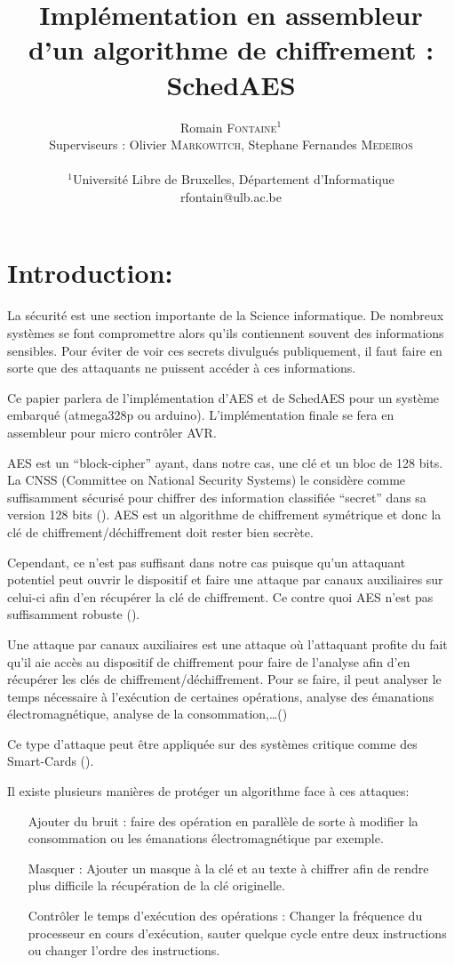 \documentclass[letterpaper]{article}
\author{Romain \textsc{Fontaine}$^{1}$\\
    Superviseurs : Olivier \textsc{Markowitch}, Stephane Fernandes \textsc{Medeiros}\\
    \mbox{}\\
    $^1$Université Libre de Bruxelles, Département d’Informatique \\
    rfontain@ulb.ac.be
}
\title{Implémentation en assembleur d'un algorithme de chiffrement :\\ SchedAES}
\date{}
\begin{document}
\maketitle

\section{Introduction:}
La sécurité est une section importante de la Science informatique. De nombreux systèmes se font compromettre alors qu'ils contiennent souvent des informations sensibles. Pour éviter de voir ces secrets divulgués publiquement, il faut faire en sorte que des attaquants ne puissent accéder à ces informations.

Ce papier parlera de l'implémentation d'AES et de SchedAES pour un système embarqué (atmega328p ou arduino). L'implémentation finale se fera en assembleur pour micro contrôler AVR.

AES est un ``block-cipher'' ayant, dans notre cas, une clé et un bloc de 128 bits.
La CNSS (Committee on National Security Systems) le considère comme suffisamment sécurisé pour chiffrer des information classifiée ``secret'' dans sa version 128 bits (\cite{policy2003no}).
AES est un algorithme de chiffrement symétrique et donc la clé de chiffrement/déchiffrement doit rester bien secrète.

Cependant, ce n'est pas suffisant dans notre cas puisque qu'un attaquant potentiel peut ouvrir le dispositif et faire une attaque par canaux auxiliaires sur celui-ci afin d'en récupérer la clé de chiffrement. Ce contre quoi AES n'est pas suffisamment robuste (\cite{Renauld2009}).

Une attaque par canaux auxiliaires est une attaque où l'attaquant profite du fait qu'il aie accès au dispositif de chiffrement pour faire de l'analyse afin d'en récupérer les clés de chiffrement/déchiffrement.
Pour se faire, il peut analyser le temps nécessaire à l'exécution de certaines opérations, analyse des émanations électromagnétique, analyse de la consommation,\ldots(\cite{zhou2005side})

Ce type d'attaque peut être appliquée sur des systèmes critique comme des Smart-Cards (\cite{chari1999cautionary}).

Il existe plusieurs manières de protéger un algorithme face à ces attaques:
\begin{itemize}
    \item[Ajouter du bruit :] faire des opération en parallèle de sorte à modifier la consommation ou les émanations électromagnétique par exemple.
    \item[Masquer :] Ajouter un masque à la clé et au texte à chiffrer afin de rendre plus difficile la récupération de la clé originelle.
    \item[Contrôler le temps d'exécution des opérations :] Changer la fréquence du processeur en cours d'exécution, sauter quelque cycle entre deux instructions ou changer l'ordre des instructions.
\end{itemize}
\end{document}
